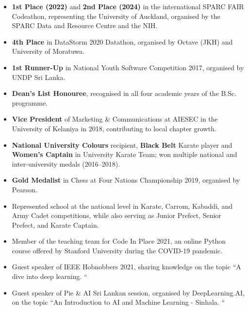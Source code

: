 \documentclass[12pt,a4paper,withhyper]{altacv}
\begin{document}
\medskip

\begin{itemize}
    \item \textbf{1st Place (2022)} and \textbf{2nd Place (2024)} in the international SPARC FAIR Codeathon, representing the University of Auckland, organised by the SPARC Data and Resource Centre and the NIH.
    \item \textbf{4th Place} in DataStorm 2020 Datathon, organised by Octave (JKH) and University of Moratuwa.
    \item \textbf{1st Runner-Up} in National Youth Software Competition 2017, organised by UNDP Sri Lanka.
    \item \textbf{Dean’s List Honouree}, recognised in all four academic years of the B.Sc. programme.

    \item \textbf{Vice President} of Marketing \& Communications at AIESEC in the University of Kelaniya in 2018, contributing to local chapter growth.

    \item \textbf{National University Colours} recipient, \textbf{Black Belt} Karate player and \textbf{Women's Captain} in University Karate Team; won multiple national and inter-university medals (2016–2018).

    \item \textbf{Gold Medalist} in Chess at Four Nations Championship 2019, organised by Pearson.
    \item Represented school at the national level in Karate, Carrom, Kabaddi, and Army Cadet competitions, while also serving as Junior Prefect, Senior Prefect, and Karate Captain.

\end{itemize}



\medskip

\begin{itemize}
    \item Member of the teaching team for Code In Place 2021, an online Python course offered by Stanford University during the COVID-19 pandemic. 
    \item Guest speaker of IEEE Hobnobbers 2021, sharing knowledge on the topic ``A dive into deep learning. ``
    \item Guest speaker of Pie \& AI Sri Lankan session, organised by DeepLearning.AI, on the topic ``An Introduction to AI and Machine Learning - Sinhala. ``
\end{itemize}

\medskip




\end{document}
